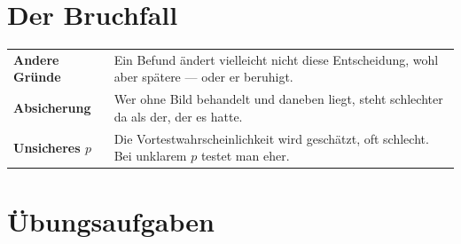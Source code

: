 \section{Der Bruchfall}

\begin{warnung}
\begin{center}
{\small
\renewcommand{\arraystretch}{1.52}
\begin{tabular}{@{}P{2.6cm}P{6.0cm}@{}}
\toprule
\textbf{Andere Gründe} & Ein Befund ändert vielleicht nicht diese Entscheidung, wohl aber spätere --- oder er beruhigt.\\
\textbf{Absicherung} & Wer ohne Bild behandelt und daneben liegt, steht schlechter da als der, der es hatte.\\
\textbf{Unsicheres $p$} & Die Vortestwahrscheinlichkeit wird geschätzt, oft schlecht. Bei unklarem $p$ testet man eher.\\
\bottomrule
\end{tabular}}
\end{center}

\begin{center}
\begin{minipage}{0.88\textwidth}
\end{minipage}
\end{center}
\end{warnung}

\section{Übungsaufgaben}

